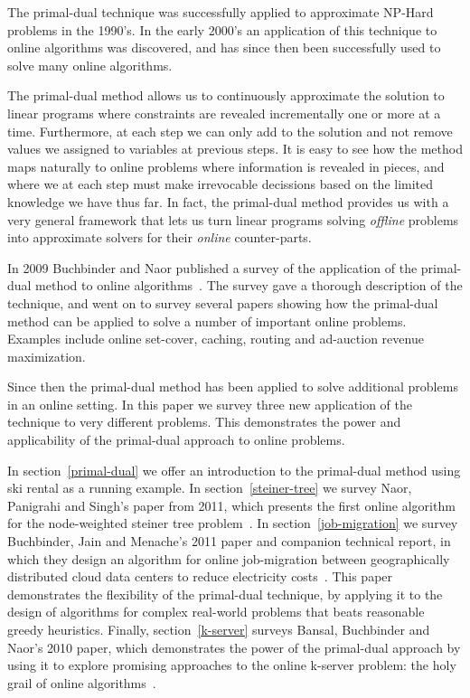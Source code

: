 The primal-dual technique was successfully applied to approximate NP-Hard problems in the 1990's.
In the early 2000's an application of this technique to online algorithms was discovered, and has since then been successfully used to solve many online algorithms.

The primal-dual method allows us to continuously approximate the solution to linear programs where constraints are revealed incrementally one or more at a time. 
Furthermore, at each step we can only add to the solution and not remove values we assigned to variables at previous steps.
It is easy to see how the method maps naturally to online problems where information is revealed in pieces, and where we at each step must make irrevocable decissions based on the limited knowledge we have thus far.
In fact, the primal-dual method provides us with a very general framework that lets us turn linear programs solving \emph{offline} problems into approximate solvers for their \emph{online} counter-parts.

In 2009 Buchbinder and Naor published a survey of the application of the primal-dual method to online algorithms~\cite{buchbinder09:survey}.
The survey gave a thorough description of the technique, and went on to survey several papers showing how the primal-dual method can be applied to solve a number of important online problems. 
Examples include online set-cover, caching, routing and ad-auction revenue maximization.

Since then the primal-dual method has been applied to solve additional problems in an online setting.
In this paper we survey three new application of the technique to very different problems.
This demonstrates the power and applicability of the primal-dual approach to online problems.

In section~\ref{primal-dual} we offer an introduction to the primal-dual method using ski rental as a running example.
In section~\ref{steiner-tree} we survey Naor, Panigrahi and Singh's paper from 2011, which presents the first online algorithm for the node-weighted steiner tree problem~\cite{naor11:node-weighted-steiner-tree}.
In section~\ref{job-migration} we survey Buchbinder, Jain and Menache's 2011 paper and companion technical report, in which they design an algorithm for online job-migration between geographically distributed cloud data centers to reduce electricity costs~\cite{buchbinder11:job-migration,buchbinder11:job-migration-techreport}.
This paper demonstrates the flexibility of the primal-dual technique, by applying it to the design of algorithms for complex real-world problems that beats reasonable greedy heuristics.
Finally, section~\ref{k-server} surveys Bansal, Buchbinder and Naor's 2010 paper, which demonstrates the power of the primal-dual approach by using it to explore promising approaches to the online k-server problem: the holy grail of online algorithms~\cite{bansal10:k-server}.
